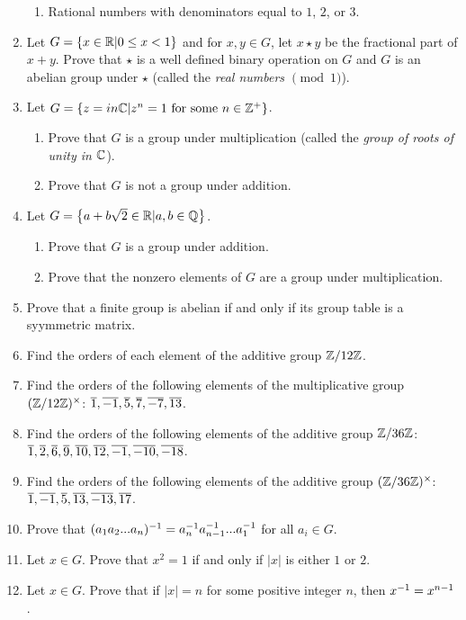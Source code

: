 \begin{enumerate}
\begin{enumerate}
			\item Rational numbers with denominators equal to $1$, $2$, or $3$.
		\end{enumerate}
		\item Let $G=\left\{x\in\mathbb{R}|0\leq x<1 \right\}$ and for $x,y\in G$, let $x\star y$ be the fractional part of $x+y$.  Prove that $\star$ is a well defined binary operation on $G$ and $G$ is an abelian group under $\star$ (called the \emph{real numbers $\pmod 1$}).
		\item Let $G = \left\{z=in \mathbb{C} | z^n = 1 \text{ for some }n\in\mathbb{Z}^+ \right\}$.
		\begin{enumerate}
			\item Prove that $G$ is a group under multiplication (called the \emph{group of roots of unity in $\mathbb{C}$}).
			\item Prove that $G$ is not a group under addition.
		\end{enumerate}
		\item Let $G = \left\{ a+b\sqrt{2}\in\mathbb{R}|a,b\in\mathbb{Q} \right\}$.
		\begin{enumerate}
			\item Prove that $G$ is a group under addition.
			\item Prove that the nonzero elements of $G$ are a group under multiplication.
		\end{enumerate}
		\item Prove that a finite group is abelian if and only if its group table is a syymmetric matrix.
		\item Find the orders of each element of the additive group $\mathbb{Z}/12\mathbb{Z}$.
		\item Find the orders of the following elements of the multiplicative group $(\mathbb{Z}/12\mathbb{Z})^\times$: $\overline{1},\overline{-1},\overline{5},\overline{7},\overline{-7},\overline{13}$.
		\item Find the orders of the following elements of the additive group $\mathbb{Z}/36\mathbb{Z}$: $\overline{1},\overline{2},\overline{6},\overline{9},\overline{10},\overline{12},\overline{-1},\overline{-10},\overline{-18}$.
		\item Find the orders of the following elements of the additive group $(\mathbb{Z}/36\mathbb{Z})^\times$: $\overline{1},\overline{-1},\overline{5},\overline{13},\overline{-13},\overline{17}$.
		\item Prove that $(a_1a_2...a_n)^{-1} = a_n^{-1} a_{n-1}^{-1} ... a_1^{-1}$ for all $a_i\in G$.
		\item Let $x\in G$.  Prove that $x^2=1$ if and only if $|x|$ is either $1$ or $2$.
		\item Let $x\in G$.  Prove that if $|x| = n$ for some positive integer $n$, then $x^{-1} = x^{n-1}$.

\end{enumerate}
